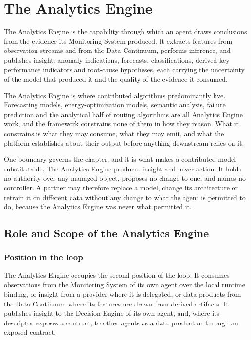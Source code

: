 
\hypertarget{the-analytics-engine}{%
\section{The Analytics Engine}\label{the-analytics-engine}}

The Analytics Engine is the capability through which an agent draws
conclusions from the evidence its Monitoring System produced. It
extracts features from observation streams and from the Data Continuum,
performs inference, and publishes insight: anomaly indications,
forecasts, classifications, derived key performance indicators and
root-cause hypotheses, each carrying the uncertainty of the model that
produced it and the quality of the evidence it consumed.

The Analytics Engine is where contributed algorithms predominantly live.
Forecasting models, energy-optimization models, semantic analysis,
failure prediction and the analytical half of routing algorithms are all
Analytics Engine work, and the framework constrains none of them in how
they reason. What it constrains is what they may consume, what they may
emit, and what the platform establishes about their output before
anything downstream relies on it.

One boundary governs the chapter, and it is what makes a contributed
model substitutable. The Analytics Engine produces insight and never
action. It holds no authority over any managed object, proposes no
change to one, and names no controller. A partner may therefore replace
a model, change its architecture or retrain it on different data without
any change to what the agent is permitted to do, because the Analytics
Engine was never what permitted it.

\hypertarget{role-and-scope-of-the-analytics-engine}{%
\subsection{Role and Scope of the Analytics Engine}\label{role-and-scope-of-the-analytics-engine}}

\hypertarget{position-in-the-loop-1}{%
\subsubsection{Position in the loop}\label{position-in-the-loop-1}}

The Analytics Engine occupies the second position of the loop. It
consumes observations from the Monitoring System of its own agent over
the local runtime binding, or insight from a provider where it is
delegated, or data products from the Data Continuum where its features
are drawn from derived artifacts. It publishes insight to the Decision
Engine of its own agent, and, where its descriptor exposes a contract,
to other agents as a data product or through an exposed contract.

